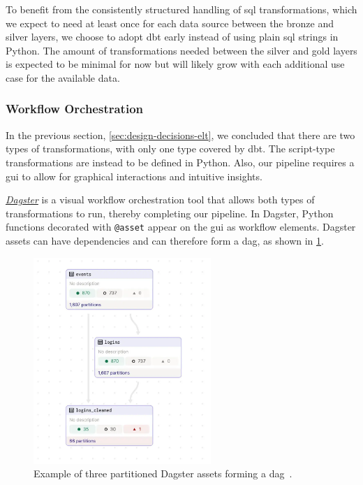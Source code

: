 To benefit from the consistently structured handling of \ac{sql} transformations, which we expect to need at least once for each data source between the bronze and silver layers, we choose to adopt dbt early instead of using plain \ac{sql} strings in Python.
The amount of transformations needed between the silver and gold layers is expected to be minimal for now but will likely grow with each additional use case for the available data.


\subsubsection{Workflow Orchestration}
\label{sec:design-decisions-orchestration}

In the previous section, \cref{sec:design-decisions-elt}, we concluded that there are two types of transformations, with only one type covered by dbt.
The script-type transformations are instead to be defined in Python.
Also, our pipeline requires a \ac{gui} to allow for graphical interactions and intuitive insights.

\href{https://dagster.io/}{\textit{Dagster}} is a visual workflow orchestration tool that allows both types of transformations to run, thereby completing our pipeline.
In Dagster, Python functions decorated with \texttt{@asset} appear on the \ac{gui} as workflow elements.
Dagster assets can have dependencies and can therefore form a \ac{dag}, as shown in \cref{fig:design-decisions-orchestration-asset}.

\begin{figure}[H]
    \centering
    \includegraphics[width=0.6\textwidth]{figures/dagster-partitioned-asset-graph.png}
    \caption{Example of three partitioned Dagster assets forming a \ac{dag}~\cite{Ryza2023}.}
    \label{fig:design-decisions-orchestration-asset}
\end{figure}

